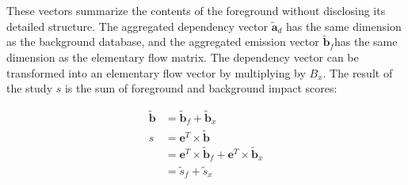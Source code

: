 These vectors summarize the contents of the foreground without disclosing its detailed structure.  The aggregated dependency vector $\tilde{\mathbf{a}}_d$ has the same dimension as the background database, and the aggregated emission vector $\tilde{\mathbf{b}}_f $has the same dimension as the elementary flow matrix.  The dependency vector can be transformed into an elementary flow vector by multiplying by $B_x$.  The result of the study $s$ is the sum of foreground and background impact scores:

\begin{equation}
\begin{array}{rl}
   \tilde{\mathbf{b}} & = \tilde{\mathbf{b}}_f + \tilde{\mathbf{b}}_x \\
   s &= \mathbf{e}^T \times \tilde{\mathbf{b}} \\
   & = \mathbf{e}^T \times \tilde{\mathbf{b}}_f + \mathbf{e}^T \times \tilde{\mathbf{b}}_x \\
   &= \tilde{s}_f + \tilde{s}_x
\end{array}
\label{eqn:lci}
\end{equation}

